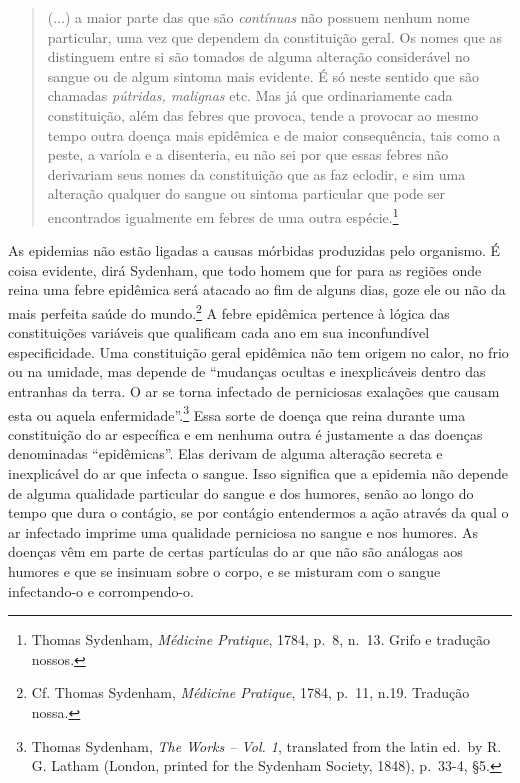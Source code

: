 \begin{quote}
(...) a maior parte das que são \emph{contínuas} não possuem nenhum nome
particular, uma vez que dependem da constituição geral. Os nomes que as
distinguem entre si são tomados de alguma alteração considerável no
sangue ou de algum sintoma mais evidente. É só neste sentido que são
chamadas \emph{pútridas, malignas} etc. Mas já que ordinariamente cada
constituição, além das febres que provoca, tende a provocar ao mesmo
tempo outra doença mais epidêmica e de maior consequência, tais como a
peste, a varíola e a disenteria, eu não sei por que essas febres não
derivariam seus nomes da constituição que as faz eclodir, e sim uma
alteração qualquer do sangue ou sintoma particular que pode ser
encontrados igualmente em febres de uma outra espécie.\footnote{Thomas
  Sydenham, \emph{Médicine Pratique}, 1784, p.~8, n.~13. Grifo e
  tradução nossos.}
\end{quote}

As epidemias não estão ligadas a causas mórbidas produzidas pelo
organismo. É coisa evidente, dirá Sydenham, que todo homem que for para
as regiões onde reina uma febre epidêmica será atacado ao fim de alguns
dias, goze ele ou não da mais perfeita saúde do mundo.\footnote{Cf.
  Thomas Sydenham, \emph{Médicine Pratique}, 1784, p.~11, n.19. Tradução
  nossa.} A febre epidêmica pertence à lógica das constituições
variáveis que qualificam cada ano em sua inconfundível especificidade.
Uma constituição geral epidêmica não tem origem no calor, no frio ou na
umidade, mas depende de ``mudanças ocultas e inexplicáveis dentro das
entranhas da terra. O ar se torna infectado de perniciosas exalações que
causam esta ou aquela enfermidade''.\footnote{Thomas Sydenham, \emph{The
  Works -- Vol. 1}, translated from the latin ed.~by R. G. Latham
  (London, printed for the Sydenham Society, 1848), p.~33-4, §5.} Essa
sorte de doença que reina durante uma constituição do ar específica e em
nenhuma outra é justamente a das doenças denominadas ``epidêmicas''.
Elas derivam de alguma alteração secreta e inexplicável do ar que
infecta o sangue. Isso significa que a epidemia não depende de alguma
qualidade particular do sangue e dos humores, senão ao longo do tempo
que dura o contágio, se por contágio entendermos a ação através da qual
o ar infectado imprime uma qualidade perniciosa no sangue e nos humores.
As doenças vêm em parte de certas partículas do ar que não são análogas
aos humores e que se insinuam sobre o corpo, e se misturam com o sangue
infectando-o e corrompendo-o.

